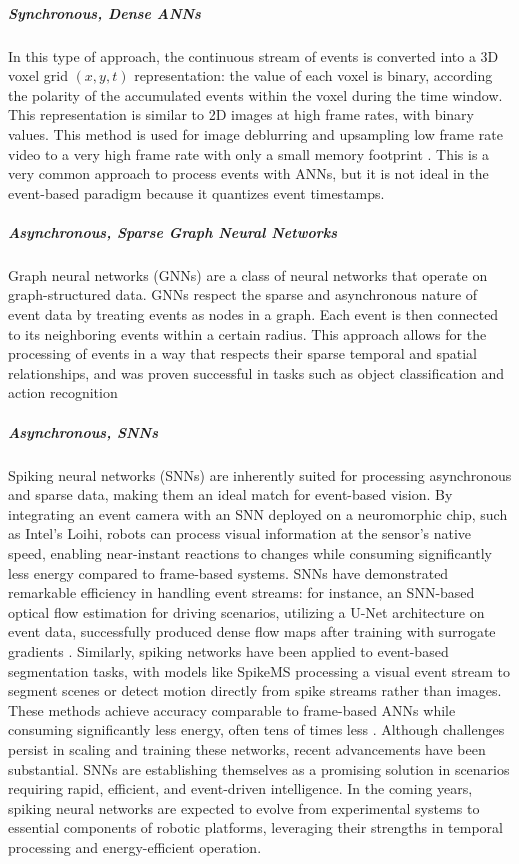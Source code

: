 \documentclass{article}
\begin{document}
\subparagraph{Synchronous, Dense ANNs} In this type of approach, the continuous stream of events is converted into a 3D voxel grid $(x,y,t)$ representation: the value of each voxel is binary, according the polarity of the accumulated events within the voxel during the time window. This representation is similar to 2D images at high frame rates, with binary values. This method is used for image deblurring and upsampling low frame rate video to a very high frame rate with only a small memory footprint \cite{tulyakovTimeLensEventbasedVideo2021}. This is a very common approach to process events with ANNs, but it is not ideal in the event-based paradigm because it quantizes event timestamps. 

\subparagraph{Asynchronous, Sparse Graph Neural Networks} Graph neural networks (GNNs) are a class of neural networks that operate on graph-structured data. GNNs respect the sparse and asynchronous nature of event data by treating events as nodes in a graph. Each event is then connected to its neighboring events within a certain radius. This approach allows for the processing of events in a way that respects their sparse temporal and spatial relationships, and was proven successful in tasks such as object classification and action recognition \cite{biGraphBasedSpatioTemporalFeature2020, dengVoxelGraphCNN2021}

\subparagraph{Asynchronous, SNNs} Spiking neural networks (SNNs) are inherently suited for processing asynchronous and sparse data, making them an ideal match for event-based vision. By integrating an event camera with an SNN deployed on a neuromorphic chip, such as Intel's Loihi, robots can process visual information at the sensor's native speed, enabling near-instant reactions to changes while consuming significantly less energy compared to frame-based systems. SNNs have demonstrated remarkable efficiency in handling event streams: for instance, an SNN-based optical flow estimation for driving scenarios, utilizing a U-Net architecture on event data, successfully produced dense flow maps after training with surrogate gradients \cite{cuadradoOpticalFlowEstimation2023}. Similarly, spiking networks have been applied to event-based segmentation tasks, with models like SpikeMS \cite{parameshwaraSpikeMSDeepSpiking2021} processing a visual event stream to segment scenes or detect motion directly from spike streams rather than images. These methods achieve accuracy comparable to frame-based ANNs while consuming significantly less energy, often tens of times less \cite{yamazakiSpikingNeuralNetworks2022}. Although challenges persist in scaling and training these networks, recent advancements have been substantial. SNNs are establishing themselves as a promising solution in scenarios requiring rapid, efficient, and event-driven intelligence. In the coming years, spiking neural networks are expected to evolve from experimental systems to essential components of robotic platforms, leveraging their strengths in temporal processing and energy-efficient operation.
\end{document}
